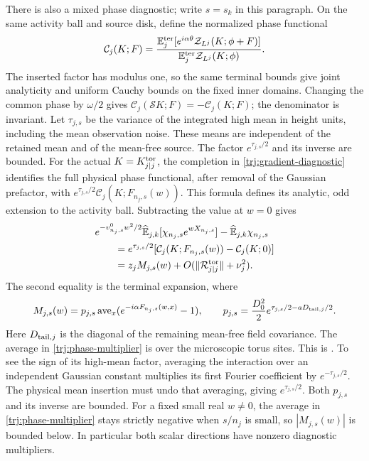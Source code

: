 There is also a mixed phase diagnostic; write \(s=s_k\) in this paragraph.
On the same activity ball and
source disk, define the normalized phase functional
\begin{equation}\label{trj:phase-functional}
 \mathcal C_j(K;F)=
 \frac{\mathbb E_j^{\rm ter}
       [e^{i\alpha\theta}\mathcal Z_{L^j}(K;\phi+F)]}
      {\mathbb E_j^{\rm ter}\mathcal Z_{L^j}(K;\phi)}.
\end{equation}
The inserted factor has modulus one, so the same terminal bounds give
joint analyticity and uniform Cauchy bounds on the fixed inner domains.
Changing the common phase by \(\omega/2\) gives
\(\mathcal C_j(\mathcal S K;F)=-\mathcal C_j(K;F)\); the denominator is
invariant.  Let \(\tau_{j,s}\) be the variance of the integrated high
mean in height units, including the mean observation noise.  These
means are independent of the retained mean and of the mean-free source.
The factor \(e^{\tau_{j,s}/2}\) and its inverse are bounded.  For the
actual \(K=K_{j|j}^{\rm tor}\), the completion in
\eqref{trj:gradient-diagnostic} identifies the full physical phase
functional, after removal of the Gaussian prefactor, with
\(e^{\tau_{j,s}/2}\mathcal C_j(K;F_{n_j,s}(w))\).  This formula defines
its analytic, odd extension to the activity ball.  Subtracting the
value at \(w=0\) gives
\begin{equation}\label{trj:mixed-diagnostic}
 \begin{split}
 &e^{-v^0_{n_j,s}w^2/2}\widehat{\mathbb E}_{j,k}
       [\chi_{n_j,s}e^{wX_{n_j,s}}]
       -\widehat{\mathbb E}_{j,k}\chi_{n_j,s}\\
 &\qquad=e^{\tau_{j,s}/2}
       [\mathcal C_j(K;F_{n_j,s}(w))-\mathcal C_j(K;0)]\\
 &\qquad=z_jM_{j,s}(w)+O(\|\mathcal R_{j|j}^{\rm tor}\|+\nu_j^2).
 \end{split}
\end{equation}
The second equality is the terminal expansion, where
\begin{equation}\label{trj:phase-multiplier}
 M_{j,s}(w)=p_{j,s}\operatorname{ave}_x
                  (e^{-i\alpha F_{n_j,s}(w,x)}-1),
 \qquad
 p_{j,s}=\frac{D_0^2}{2}
          e^{\tau_{j,s}/2-aD_{{\rm tail},j}/2}.
\end{equation}
Here \(D_{{\rm tail},j}\) is the diagonal of the remaining mean-free
field covariance.
The average in \eqref{trj:phase-multiplier} is over the microscopic
torus sites.
This is \cite[Equation~(10.4)]{B}.  To see the sign of its high-mean
factor, averaging the interaction over an independent Gaussian constant
multiplies its first Fourier coefficient by \(e^{-\tau_{j,s}/2}\).
The physical mean insertion must undo that averaging, giving
\(e^{\tau_{j,s}/2}\).  Both \(p_{j,s}\) and its inverse are bounded.
For a fixed small real \(w\ne0\), the average in
\eqref{trj:phase-multiplier} stays strictly negative when \(s/n_j\)
is small, so \(|M_{j,s}(w)|\) is bounded below.  In particular both
scalar directions have nonzero diagnostic multipliers.

